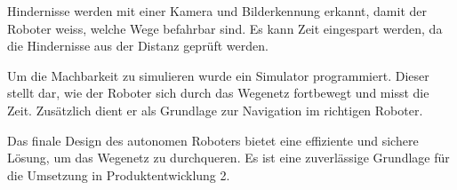 Hindernisse werden mit einer Kamera und Bilderkennung erkannt, damit der Roboter weiss, welche Wege befahrbar sind. Es kann Zeit eingespart werden, da die Hindernisse aus der Distanz geprüft werden.

Um die Machbarkeit zu simulieren wurde ein Simulator programmiert. Dieser stellt dar, wie der Roboter sich durch das Wegenetz fortbewegt und misst die Zeit. Zusätzlich dient er als Grundlage zur Navigation im richtigen Roboter.

Das finale Design des autonomen Roboters bietet eine effiziente und sichere Lösung, um das Wegenetz zu durchqueren. Es ist eine zuverlässige Grundlage für die Umsetzung in Produktentwicklung 2.

